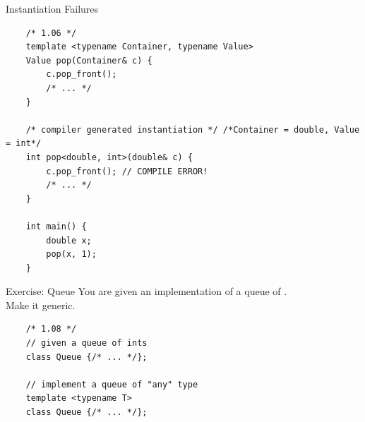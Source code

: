 \begin{frame}[fragile]{Instantiation Failures}
  \begin{verbatim}
    /* 1.06 */
    template <typename Container, typename Value>
    Value pop(Container& c) {
        c.pop_front();
        /* ... */
    }

    /* compiler generated instantiation */ /*Container = double, Value = int*/
    int pop<double, int>(double& c) {
        c.pop_front(); // COMPILE ERROR!
        /* ... */
    }

    int main() {
        double x;
        pop(x, 1);
    }
  \end{verbatim}
\end{frame}

\begin{frame}[fragile]{Exercise: Queue}
  You are given an implementation of a queue of .\\
  Make it generic.

  \begin{verbatim}
    /* 1.08 */
    // given a queue of ints
    class Queue {/* ... */};

    // implement a queue of "any" type
    template <typename T>
    class Queue {/* ... */};
  \end{verbatim}
\end{frame}